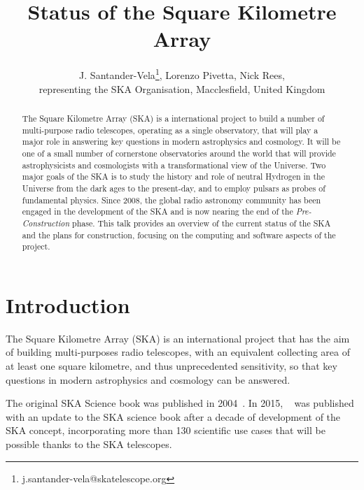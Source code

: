 \documentclass[a4paper,
               biblatex,       %
               keeplastbox,    %
               ]{jacow-2_1}    %
\begin{document}
\title{Status of the Square Kilometre Array}

\author{
	J. Santander-Vela\thanks{j.santander-vela@skatelescope.org},
	Lorenzo Pivetta, Nick Rees,\\
	representing the SKA Organisation, Macclesfield, United Kingdom
}
	
\maketitle

\begin{abstract}
	The Square Kilometre Array (SKA) is a international project to build a number of multi-purpose radio telescopes, operating as a single observatory, that will play a major role in answering key questions in modern astrophysics and cosmology. It will be one of a small number of cornerstone observatories around the world that will provide astrophysicists and cosmologists with a transformational view of the Universe. Two major goals of the SKA is to study the history and role of neutral Hydrogen in the Universe from the dark ages to the present-day, and to employ pulsars as probes of fundamental physics. Since 2008, the global radio astronomy community has been engaged in the development of the SKA and is now nearing the end of the \emph{Pre-Construction} phase. This talk provides an overview of the current status of the SKA and the plans for construction, focusing on the computing and software aspects of the project.
\end{abstract}


\section{Introduction} %
\label{sec:introduction}
The Square Kilometre Array (SKA) is an international project that has the aim of building multi-purposes radio telescopes, with an equivalent collecting area of at least one square kilometre, and thus unprecedented sensitivity, so that key questions in modern astrophysics and cosmology can be answered.

The original SKA Science book was published in 2004~\cite{2004NewAR..48..979C}. In 2015, ~\cite{2015aska.confE.....} was published with an update to the SKA science book after a decade of development of the SKA concept, incorporating more than 130 scientific use cases that will be possible thanks to the SKA telescopes.
\end{document}
